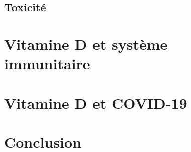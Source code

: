 \documentclass[
  letterpaper,
  DIV=11,
  numbers=noendperiod]{scrartcl}
\begin{document}
\hypertarget{toxicituxe9}{%
\subsection{Toxicité}\label{toxicituxe9}}

\hypertarget{vitamine-d-et-systuxe8me-immunitaire}{%
\section{Vitamine D et système
immunitaire}\label{vitamine-d-et-systuxe8me-immunitaire}}

\hypertarget{vitamine-d-et-covid-19}{%
\section{Vitamine D et COVID-19}\label{vitamine-d-et-covid-19}}

\newpage{}

\hypertarget{conclusion}{%
\section{Conclusion}\label{conclusion}}

\newpage{}


\printbibliography[title=References]
\end{document}
